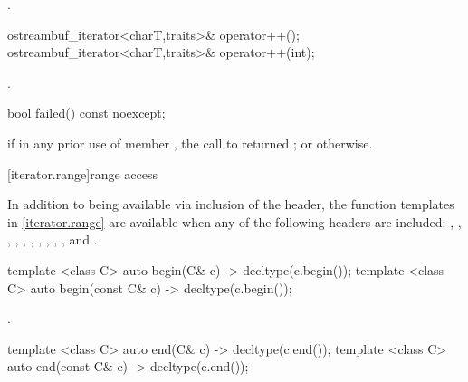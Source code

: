 \begin{itemdescr}
\pnum
\returns
{}.
\end{itemdescr}

%
\begin{itemdecl}
ostreambuf_iterator<charT,traits>& operator++();
ostreambuf_iterator<charT,traits>& operator++(int);
\end{itemdecl}

\begin{itemdescr}
\pnum
\returns
{}.
\end{itemdescr}

%
\begin{itemdecl}
bool failed() const noexcept;
\end{itemdecl}

\begin{itemdescr}
\pnum
\returns
{}
if in any prior use of member
,
the call to
returned
;
or
otherwise.
\end{itemdescr}

[iterator.range]{range access}

\pnum
In addition to being available via inclusion of the  header,
the function templates in \ref{iterator.range} are available when any of the following
headers are included: , , ,
, , , , ,
, , and .

%
\begin{itemdecl}
template <class C> auto begin(C& c) -> decltype(c.begin());
template <class C> auto begin(const C& c) -> decltype(c.begin());
\end{itemdecl}

\begin{itemdescr}
\pnum
\returns {}.
\end{itemdescr}

%
\begin{itemdecl}
template <class C> auto end(C& c) -> decltype(c.end());
template <class C> auto end(const C& c) -> decltype(c.end());
\end{itemdecl}

